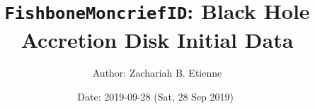 \documentclass{article}
\begin{document}
\title{{\tt FishboneMoncriefID}: Black Hole Accretion Disk Initial Data}

\author{Author: Zachariah B. Etienne}

\date{$ $Date: 2019-09-28 (Sat, 28 Sep 2019) $ $}
\maketitle

%
%  
%                                                    
\end{document}
